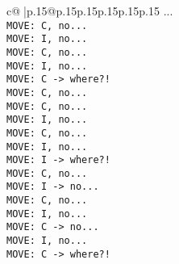 \documentclass{article}
\begin{document}
{\begin{supertabular}{c@{$\;$}|p{.15\linewidth}@{}p{.15\linewidth}p{.15\linewidth}p{.15\linewidth}p{.15\linewidth}p{.15\linewidth}}
{{{...\\ \tt  MOVE: C, no...\\ \tt  MOVE: I, no...\\ \tt  MOVE: C, no...\\ \tt  MOVE: I, no...\\ \tt  MOVE: C -> where?!\\ \tt  MOVE: C, no...\\ \tt  MOVE: C, no...\\ \tt  MOVE: I, no...\\ \tt  MOVE: C, no...\\ \tt  MOVE: I, no...\\ \tt  MOVE: I -> where?!\\ \tt  MOVE: C, no...\\ \tt  MOVE: I -> no...\\ \tt  MOVE: C, no...\\ \tt  MOVE: I, no...\\ \tt  MOVE: C -> no...\\ \tt  MOVE: I, no...\\ \tt  MOVE: C -> where?!\\ \tt}}}
\end{supertabular}}
\end{document}
